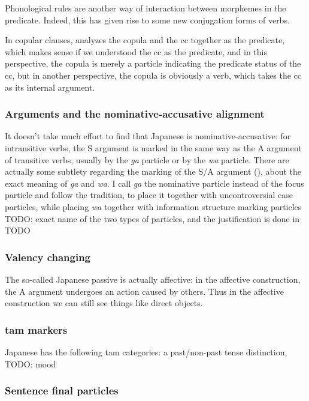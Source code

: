 \documentclass[UTF8, a4paper, oneside, scheme=plain]{ctexart}
\newcommand{\corpus}[1]{\emph{#1}}
\begin{document}
Phonological rules are another way of interaction between morphemes in the predicate.
Indeed, this has given rise to some new conjugation forms of verbs.

In copular clauses,
\citet{tsutsui1989dictionary} analyzes the copula and the \acs{cc} together as the predicate,
which makes sense if we understood the \acs{cc} as the predicate,
and in this perspective, the copula is merely a particle indicating the predicate status of the \acs{cc},
but in another perspective, the copula is obviously a verb,
which takes the \acs{cc} as its internal argument.

\subsubsection{Arguments and the nominative-accusative alignment}\label{sec:alignment}

It doesn't take much effort to find that Japanese is nominative-accusative:
for intransitive verbs,
the S argument is marked in the same way as the A argument of transitive verbs,
usually by the \corpus{ga} particle or by the \corpus{wa} particle.
There are actually some subtlety regarding the marking of the S/A argument (),
about the exact meaning of \corpus{ga} and \corpus{wa}.
I call \corpus{ga} the nominative particle instead of the focus particle 
and follow the tradition, to place it together with uncontroversial case particles,
while placing \corpus{wa} together with information structure marking particles TODO: exact name of the two types of particles,
and the justification is done in TODO

\subsubsection{Valency changing}

The so-called Japanese passive is actually affective:
in the affective construction, the A argument undergoes an action caused by others. 
Thus in the affective construction we can still see things like direct objects.

\subsubsection{\ac{tam} markers}

Japanese has the following \ac{tam} categories:
a past/non-past tense distinction,
TODO: mood

\subsubsection{Sentence final particles}
\end{document}
